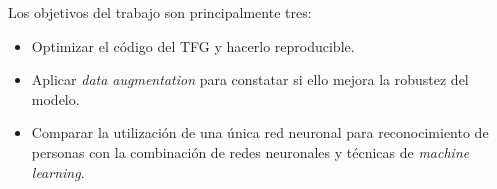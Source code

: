  \label{capitulo2}

Los objetivos del trabajo son principalmente tres:
\begin{itemize}
    \item Optimizar el código del TFG \cite{tfg_iris_2020} y hacerlo reproducible.
    \item Aplicar \textit{data augmentation} para constatar si ello mejora la robustez del modelo.
    \item Comparar la utilización de una única red neuronal para reconocimiento de personas con la combinación de redes neuronales y técnicas de \textit{machine learning}.                                                                                                                                                                                                           
\end{itemize}